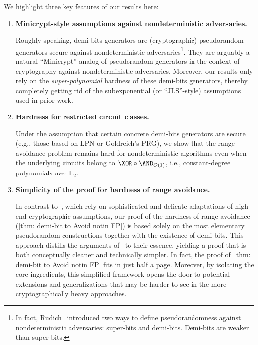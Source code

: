 We highlight three key features of our results here:
\begin{enumerate}
    \item {\bf Minicrypt-style assumptions against nondeterministic adversaries.}
    
    Roughly speaking, demi-bits generators are (cryptographic) pseudorandom generators secure against nondeterministic adversaries\footnote{In fact, Rudich~\cite{Rudich97} introduced two ways to define pseudorandomness against nondeterministic adversaries: super-bits and demi-bits. Demi-bits are weaker than super-bits.}. They are arguably a natural ``Minicrypt'' analog of pseudorandom generators in the context of cryptography against nondeterministic adversaries. Moreover, our results only rely on the \emph{super-polynomial} hardness of these demi-bits generators, thereby completely getting rid of the subexponential (or ``JLS''-style) assumptions used in prior work.
    \item {\bf Hardness for restricted circuit classes.}
    
    Under the assumption that certain concrete demi-bits generators are secure (e.g., those based on LPN or Goldreich's PRG), we show that the range avoidance problem remains hard for nondeterministic algorithms even when the underlying circuits belong to $\XOR\circ\AND_{O(1)}$, i.e., constant-degree polynomials over $\mathbb{F}_2$.

    \item {\bf Simplicity of the proof for hardness of range avoidance.}
    
    In contrast to~\cite{DBLP:conf/stoc/IlangoLW23,DBLP:conf/stoc/ChenL24}, which rely on sophisticated and delicate adaptations of high-end cryptographic assumptions, our proof of the hardness of range avoidance (\autoref{thm: demi-bit to Avoid notin FP}) is based solely on the most elementary pseudorandom constructions together with the existence of demi-bits. This approach distills the arguments of~\cite{DBLP:conf/stoc/IlangoLW23,DBLP:conf/stoc/ChenL24} to their essence, yielding a proof that is both conceptually cleaner and technically simpler. In fact, the proof of~\autoref{thm: demi-bit to Avoid notin FP} fits in just half a page. Moreover, by isolating the core ingredients, this simplified framework opens the door to potential extensions and generalizations that may be harder to see in the more cryptographically heavy approaches.
    
\end{enumerate}




